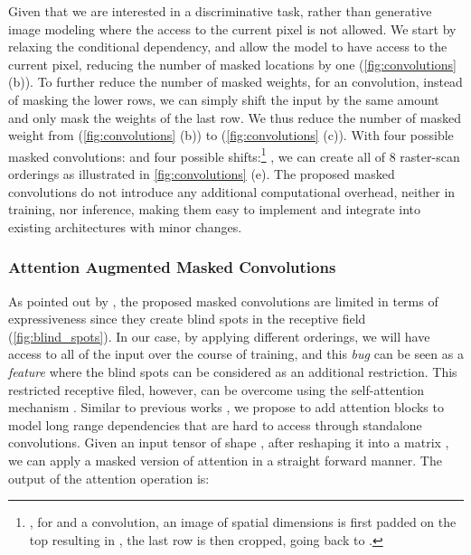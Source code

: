 Given that we are interested in a discriminative task, rather than
generative image modeling where the access to the current pixel is not allowed.
We start by relaxing the conditional dependency, and allow the model to have
access to the current pixel, reducing the number of masked locations
by one (\cref{fig:convolutions} (b)).
To further reduce the number of masked weights,
for an  convolution, instead of 
masking the lower rows,
we can simply shift the input by the same amount and only
mask the weights of the last row.
We thus reduce the number of masked weight from
 (\cref{fig:convolutions} (b))
to  (\cref{fig:convolutions} (c)).
With four possible masked convolutions: 
and four possible shifts:\footnote{\eg, for  and a  convolution,
an image of spatial dimensions  is first padded on the top resulting in ,
the last row is then cropped, going back to .} ,
we can create all of 8 raster-scan orderings as illustrated in \cref{fig:convolutions} (e).
The proposed masked convolutions do not introduce any additional computational overhead, neither in training,
nor inference, making them easy to implement and integrate into existing architectures with minor changes.







\vspace{-0.1in}
\subsubsection{Attention Augmented Masked Convolutions} \label{acc}
As pointed out by \cite{pcnn}, the proposed masked convolutions
are limited in terms of expressiveness since they create
blind spots in the receptive field (\cref{fig:blind_spots}).
In our case, by applying different orderings, we will have access to all of the input  over
the course of training, and
this \textit{bug} can be seen as a \textit{feature} where the blind spots can be considered as an additional restriction.
This restricted receptive filed, however, can be overcome using the self-attention mechanism \cite{attalluneed}.
Similar to previous works \cite{nonlocal,atgan,attaugmentedconv},
we propose to add attention blocks to model long range dependencies that are hard to access
through standalone convolutions.
Given an input tensor of shape , after reshaping it into a matrix ,
we can apply a masked version of attention \cite{attalluneed} in a straight forward manner.
The output of the attention operation is:

